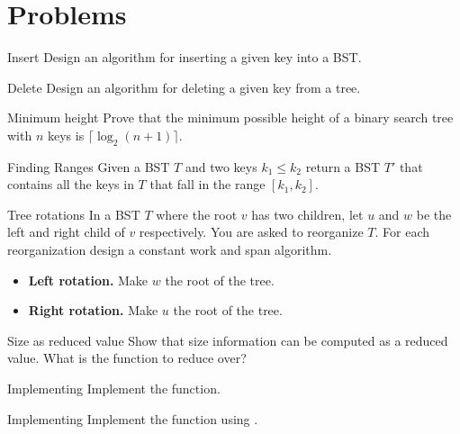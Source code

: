 \newpage
\section{Problems}


\begin{probl}{Insert}
Design an algorithm for inserting a given key into a BST.
\end{probl}

\begin{probl}{Delete}
Design an algorithm for deleting a given key from a tree. 
\end{probl}



\begin{probl}{Minimum height}
Prove that the minimum possible height of a binary search tree
with $n$ keys is $\lceil \log_2 (n + 1)\rceil$.
\end{probl}

\begin{probl}{Finding Ranges}
Given a BST $T$ and two keys $k_1 \le k_2$ return a BST $T'$ that
contains all the keys in $T$ that fall in the range $[k_1, k_2]$. 
\end{probl}

\begin{probl}{Tree rotations}
In a BST $T$ where the root $v$ has two children, let $u$ and $w$ be
the left and right child of $v$ respectively.  You are asked to
reorganize $T$.  For each reorganization design a constant work and
span algorithm.

\begin{itemize}
\item 
\textbf{Left rotation.} Make $w$ the root of the tree.

\item 
\textbf{Right rotation.} Make $u$ the root of the tree.

\end{itemize}

\end{probl}


\begin{probl}{Size as reduced value}
Show that size information can be computed as a reduced value.  What
is the function to reduce over?
\end{probl}

\begin{probl}{Implementing }
Implement the  function.
\end{probl}

\begin{probl}{Implementing }
Implement the  function using .
\end{probl}
